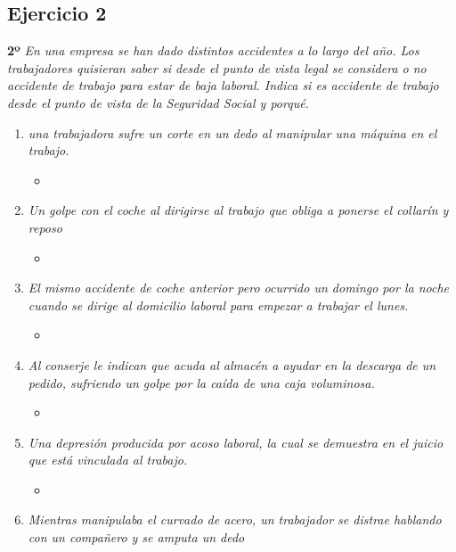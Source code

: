 \documentclass{article}
\begin{document}
      \subsection{Ejercicio 2}
        \textbf{2º} \textit{En una empresa se han dado distintos accidentes a lo largo del año. Los trabajadores quisieran saber si desde el 
        punto de vista legal se considera o no accidente de trabajo para estar de baja laboral. Indica si es accidente de trabajo desde el 
        punto de vista de la Seguridad Social y porqué.}
        \\
        \begin{enumerate}[label=(\alph*)]
          \item \textit{una trabajadora sufre un corte en un dedo al manipular una máquina en el trabajo.}
            \begin{itemize}
              \item 
            \end{itemize}
          \item \textit{Un golpe con el coche al dirigirse al trabajo que obliga a ponerse el collarín y reposo}
            \begin{itemize}
              \item 
            \end{itemize}
          \item \textit{El mismo accidente de coche anterior pero ocurrido un domingo por la noche cuando se dirige al domicilio laboral para empezar a trabajar el lunes.}
            \begin{itemize}
              \item 
            \end{itemize}
          \item \textit{Al conserje le indican que acuda al almacén a ayudar en la descarga de un pedido, sufriendo un golpe por la caída de una caja voluminosa.}
            \begin{itemize}
              \item 
            \end{itemize}
          \item \textit{Una depresión producida por acoso laboral, la cual se demuestra en el juicio que está vinculada al trabajo.}
            \begin{itemize}
              \item 
            \end{itemize}
          \item \textit{Mientras manipulaba el curvado de acero, un trabajador se distrae hablando con un compañero y se amputa un dedo}

\end{enumerate}
\end{document}
